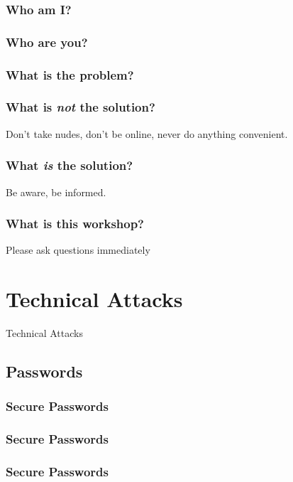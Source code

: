 \documentclass[aspectratio=169,dvipsnames]{beamer}
\begin{document}
\begin{frame}
\frametitle{Who am I?}
\end{frame}

\begin{frame}
\frametitle{Who are you?}
\end{frame}

\begin{frame}
\frametitle{What is the problem?}
\end{frame}

\begin{frame}
\frametitle{What is \emph{not} the solution?}
Don't take nudes, don't be online, never do anything convenient.
\end{frame}

\begin{frame}
\frametitle{What \emph{is} the solution?}
Be aware, be informed.
\end{frame}

\begin{frame}
\frametitle{What is this workshop?}
Please ask questions immediately
\end{frame}


\section{Technical Attacks}
\begin{frame}
\begin{center}
\huge Technical Attacks\normalsize
\end{center}
\end{frame}

\subsection{Passwords}

\subsubsection{Secure Passwords}

\begin{frame}
\frametitle{Secure Passwords}
\end{frame}

\begin{frame}
\frametitle{Secure Passwords}
\end{frame}
\end{document}
